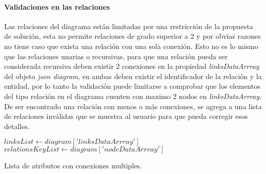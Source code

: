 \paragraph*{Validaciones en las relaciones}

Las relaciones del diagrama están limitadas por una restricción de la propuesta de solución, esta no permite relaciones de grado superior a 2 y por obvias razones no tiene caso que exista una relación con una sola conexión. Esto no es lo mismo que las relaciones unarias o recursivas, para que una relación pueda ser considerada recursiva deben existir 2 conexiones en la propiedad \textit{linksDataArrray} del objeto \textit{json diagram}, en ambas deben existir el identificador de la relación y la entidad, por lo tanto la validación puede limitarse a comprobar que los elementos del tipo relación en el diagrama cuenten con maximo 2 nodos en \textit{linksDataArrray}. De ser encontrado una relación con menos o más conexiones, se agrega a una lista de relaciones inválidas que se muestra al usuario para que pueda corregir esos detalles.

\begin{algorithm}[H]

  $linksList \gets diagram['linksDataArrray']$\\
  $relationsKeyList \gets diagram['nodeDataArrray']$\\

  \caption{Lista de atributos con conexiones multiples.}
\end{algorithm}